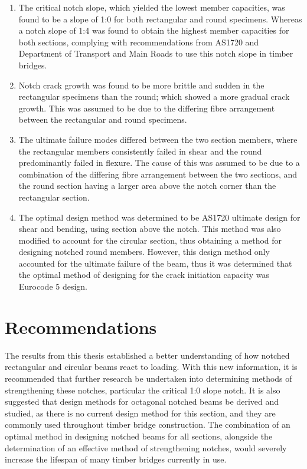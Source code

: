 \documentclass[11pt,a4paper]{article}
\numberwithin{equation}{subsection}
\begin{document}
	\begin{enumerate}
		\item The critical notch slope, which yielded the lowest member capacities, was found to be a slope of 1:0 for both rectangular and round specimens. Whereas a notch slope of 1:4 was found to obtain the highest member capacities for both sections, complying with recommendations from AS1720 and Department of Transport and Main Roads to use this notch slope in timber bridges.
		\item Notch crack growth was found to be more brittle and sudden in the rectangular specimens than the round; which showed a more gradual crack growth. This was assumed to be due to the differing fibre arrangement between the rectangular and round specimens.
		\item The ultimate failure modes differed between the two section members, where the rectangular members consistently failed in shear and the round predominantly failed in flexure. The cause of this was assumed to be due to a combination of the differing fibre arrangement between the two sections, and the round section having a larger area above the notch corner than the rectangular section.
		\item The optimal design method was determined to be AS1720 ultimate design for shear and bending, using section above the notch. This method was also modified to account for the circular section, thus obtaining a method for designing notched round members. However, this design method only accounted for the ultimate failure of the beam, thus it was determined that the optimal method of designing for the crack initiation capacity was Eurocode 5 design. 
	\end{enumerate}

\pagebreak	

\section{Recommendations}
The results from this thesis established a better understanding of how notched rectangular and circular beams react to loading. With this new information, it is recommended that further research be undertaken into determining methods of strengthening these notches, particular the critical 1:0 slope notch. It is also suggested that design methods for octagonal notched beams be derived and studied, as there is no current design method for this section, and they are commonly used throughout timber bridge construction. The combination of an optimal method in designing notched beams for all sections, alongside the determination of an effective method of strengthening notches, would severely increase the lifespan of many timber bridges currently in use.
\end{document}
